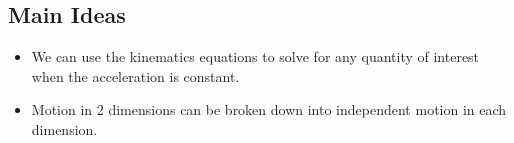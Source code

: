 \documentclass[]{article}
\begin{document}
\newpage
\begin{TeacherMargin}

\end{TeacherMargin}
\begin{PresentSpace}
\section*{Main Ideas}
\begin{itemize}
	\item We can use the kinematics equations to solve for any quantity of interest when the acceleration is constant.
	\item Motion in 2 dimensions can be broken down into independent motion in each dimension.
\end{itemize}
\end{PresentSpace}
\end{document}
